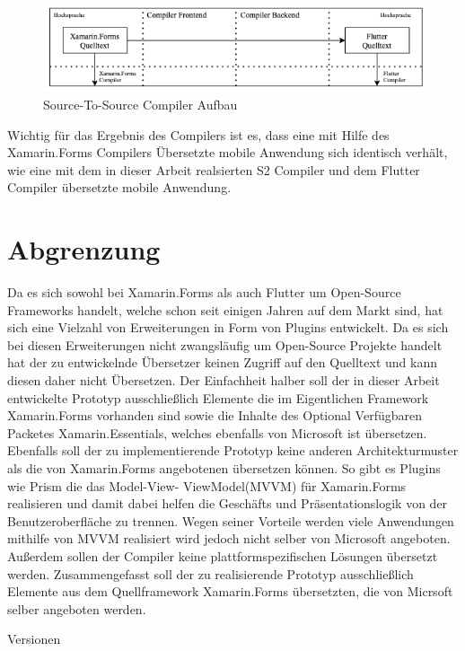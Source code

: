 \begin{figure}[!ht]
 \includegraphics[width=14.5cm]{Images/CompilerArchitecture/S2SArchitecture.png}
 \caption{Source-To-Source Compiler Aufbau}
 \label{fig:S2SCompilerAufbau}
\end{figure}

Wichtig für das Ergebnis des Compilers ist es,  dass eine mit Hilfe des Xamarin.Forms Compilers Übersetzte mobile Anwendung sich identisch verhält, wie eine mit dem in dieser Arbeit realsierten S2 Compiler und dem Flutter Compiler übersetzte mobile Anwendung. 


\section{Abgrenzung}
Da es sich sowohl bei Xamarin.Forms als auch Flutter um Open-Source Frameworks handelt, welche schon seit einigen Jahren auf dem Markt sind,  hat sich  eine Vielzahl von Erweiterungen in Form von Plugins entwickelt.  Da es sich bei diesen Erweiterungen nicht zwangsläufig um Open-Source Projekte handelt hat der zu entwickelnde Übersetzer keinen Zugriff auf den Quelltext und kann diesen daher nicht Übersetzen.  Der Einfachheit halber soll der in dieser Arbeit entwickelte Prototyp ausschließlich Elemente die im Eigentlichen Framework Xamarin.Forms vorhanden sind sowie die Inhalte des Optional Verfügbaren Packetes Xamarin.Essentials, welches ebenfalls von Microsoft ist übersetzen.  Ebenfalls soll der zu implementierende Prototyp keine anderen Architekturmuster als die von Xamarin.Forms angebotenen übersetzen können.  So gibt es  Plugins wie Prism die das Model-View- ViewModel(MVVM) für Xamarin.Forms realisieren und damit dabei helfen die Geschäfts und Präsentationslogik von der Benutzeroberfläche zu trennen.  Wegen seiner Vorteile werden viele Anwendungen mithilfe von MVVM realisiert wird jedoch nicht selber von Microsoft angeboten.  Außerdem sollen der Compiler keine plattformspezifischen Lösungen übersetzt werden.
Zusammengefasst soll der zu realisierende Prototyp ausschließlich Elemente aus dem Quellframework Xamarin.Forms übersetzten, die von Micrsoft selber angeboten werden. 

Versionen


